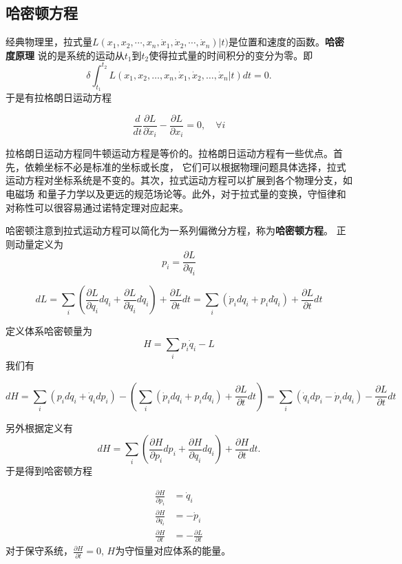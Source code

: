 \subsection{哈密顿方程}
经典物理里，拉式量$L(x_1, x_2, \cdots, x_n, \dot{x}_1, \dot{x}_2, \cdots, \dot{x}_n)|t)$是位置和速度的函数。\textbf{哈密度原理}
说的是系统的运动从$t_1$到$t_2$使得拉式量的时间积分的变分为零。即
\begin{equation}
    \delta \int_{t_1}^{t_2} L\left(x_1, x_2, \ldots, x_n, \dot{x}_1, \dot{x}_2, \ldots, \dot{x}_n | t\right) d t=0 .
\end{equation}
于是有拉格朗日运动方程

\begin{equation}
    \frac{d}{d t} \frac{\partial L}{\partial \dot{x}_i}-\frac{\partial L}{\partial x_i}=0, \quad \forall i
\end{equation}

拉格朗日运动方程同牛顿运动方程是等价的。拉格朗日运动方程有一些优点。首先，依赖坐标不必是标准的坐标或长度，
它们可以根据物理问题具体选择，拉式运动方程对坐标系统是不变的。其次，拉式运动方程可以扩展到各个物理分支，如电磁场
和量子力学以及更远的规范场论等。此外，对于拉式量的变换，守恒律和对称性可以很容易通过诺特定理对应起来。


哈密顿注意到拉式运动方程可以简化为一系列偏微分方程，称为\textbf{哈密顿方程}。
正则动量定义为
\begin{equation}
    p_i=\frac{\partial L}{\partial \dot{q}_i}
\end{equation}

\begin{equation}
    d L=\sum_i\left(\frac{\partial L}{\partial q_i} d q_i+\frac{\partial L}{\partial \dot{q}_i} d \dot{q}_i\right)+\frac{\partial L}{\partial t} d t=\sum_i\left(\dot{p}_i d q_i+p_i d \dot{q}_i\right)+\frac{\partial L}{\partial t} d t
\end{equation}

定义体系哈密顿量为
\begin{equation}
    H=\sum_i p_i \dot{q}_i-L
\end{equation}
我们有

\begin{equation}
    d H=\sum_i\left(p_i d \dot{q}_i+\dot{q}_i d p_i\right)-\left(\sum_i\left(\dot{p}_i d q_i+p_i d \dot{q}_i\right)+\frac{\partial L}{\partial t} d t\right)=\sum_i\left(\dot{q}_i d p_i-\dot{p}_i d q_i\right)-\frac{\partial L}{\partial t} d t
\end{equation}

另外根据定义有
\begin{equation}
    d H=\sum_i\left(\frac{\partial H}{\partial p_i} d p_i+\frac{\partial H}{\partial q_i} d q_i\right)+\frac{\partial H}{\partial t} d t .
\end{equation}
于是得到哈密顿方程

\begin{align}
    \frac{\partial H}{\partial p_i}&=\dot{q}_i
    \\
    \frac{\partial H}{\partial q_i}&=-\dot{p}_i
    \\
    \frac{\partial H}{\partial t}&=-\frac{\partial L}{\partial t}
\end{align}
对于保守系统，$\frac{\partial H}{\partial t}=0$, $H$为守恒量对应体系的能量。